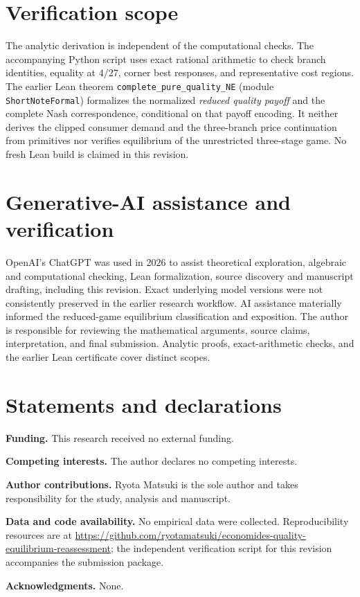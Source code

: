 \documentclass[11pt]{article}
\begin{document}
\section{Verification scope}\label{app:transparency}
The analytic derivation is independent of the computational checks. The accompanying Python script uses exact rational arithmetic to check branch identities, equality at $4/27$, corner best responses, and representative cost regions. The earlier Lean theorem \texttt{complete\_pure\_quality\_NE} (module \texttt{ShortNoteFormal}) formalizes the normalized \emph{reduced quality payoff} and the complete Nash correspondence, conditional on that payoff encoding. It neither derives the clipped consumer demand and the three-branch price continuation from primitives nor verifies equilibrium of the unrestricted three-stage game. No fresh Lean build is claimed in this revision.

\section*{Generative-AI assistance and verification}
OpenAI's ChatGPT was used in 2026 to assist theoretical exploration, algebraic and computational checking, Lean formalization, source discovery and manuscript drafting, including this revision. Exact underlying model versions were not consistently preserved in the earlier research workflow. AI assistance materially informed the reduced-game equilibrium classification and exposition. The author is responsible for reviewing the mathematical arguments, source claims, interpretation, and final submission. Analytic proofs, exact-arithmetic checks, and the earlier Lean certificate cover distinct scopes.

\section*{Statements and declarations}
\noindent\textbf{Funding.} This research received no external funding.\par
\noindent\textbf{Competing interests.} The author declares no competing interests.\par
\noindent\textbf{Author contributions.} Ryota Matsuki is the sole author and takes responsibility for the study, analysis and manuscript.\par
\noindent\textbf{Data and code availability.} No empirical data were collected. Reproducibility resources are at \url{https://github.com/ryotamatsuki/economides-quality-equilibrium-reassessment}; the independent verification script for this revision accompanies the submission package.\par
\noindent\textbf{Acknowledgments.} None.\par



\end{document}
